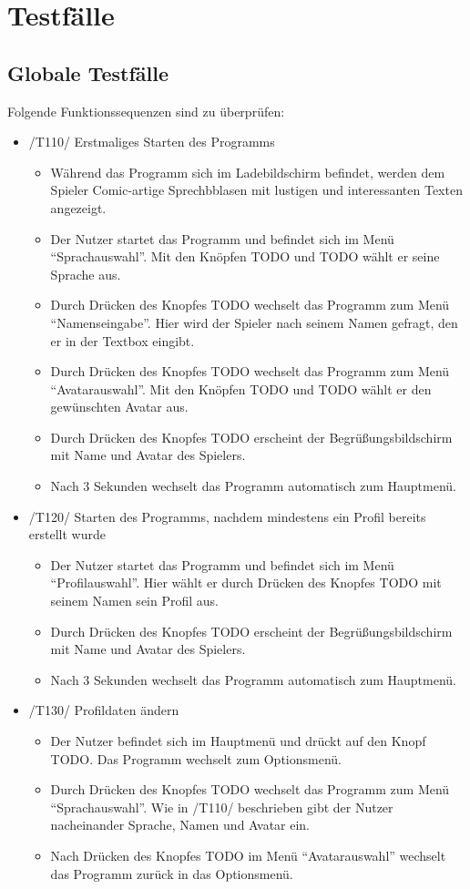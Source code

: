 \section{Testfälle}


\subsection{Globale Testfälle}
Folgende Funktionssequenzen sind zu überprüfen:

\begin{itemize}
\item /T110/ Erstmaliges Starten des Programms
\begin{itemize}
\item Während das Programm sich im Ladebildschirm befindet, werden dem Spieler Comic-artige Sprechbblasen mit lustigen und interessanten Texten angezeigt.
\item Der Nutzer startet das Programm und befindet sich im Menü "`Sprachauswahl"'. Mit den Knöpfen TODO und TODO wählt er seine Sprache aus.
\item Durch Drücken des Knopfes TODO wechselt das Programm zum Menü "`Namenseingabe"'. Hier wird der Spieler nach seinem Namen gefragt, den er in der Textbox eingibt.
\item Durch Drücken des Knopfes TODO wechselt das Programm zum Menü "`Avatarauswahl"'. Mit den Knöpfen TODO und TODO wählt er den gewünschten Avatar aus.
\item Durch Drücken des Knopfes TODO erscheint der Begrüßungsbildschirm mit Name und Avatar des Spielers.
\item Nach 3 Sekunden wechselt das Programm automatisch zum Hauptmenü.
\end{itemize}

\item /T120/ Starten des Programms, nachdem mindestens ein Profil bereits erstellt wurde
\begin{itemize}
\item Der Nutzer startet das Programm und befindet sich im Menü "`Profilauswahl"'. Hier wählt er durch Drücken des Knopfes TODO mit seinem Namen sein Profil aus.
\item Durch Drücken des Knopfes TODO erscheint der Begrüßungsbildschirm mit Name und Avatar des Spielers.
\item Nach 3 Sekunden wechselt das Programm automatisch zum Hauptmenü.
\end{itemize}

\item /T130/ Profildaten ändern
\begin{itemize}
\item Der Nutzer befindet sich im Hauptmenü und drückt auf den Knopf TODO. Das Programm wechselt zum Optionsmenü.
\item Durch Drücken des Knopfes TODO wechselt das Programm zum Menü "`Sprachauswahl"'. Wie in /T110/ beschrieben gibt der Nutzer nacheinander Sprache, Namen und Avatar ein.
\item Nach Drücken des Knopfes TODO im Menü "`Avatarauswahl"' wechselt das Programm zurück in das Optionsmenü.
\end{itemize}


\end{itemize}
